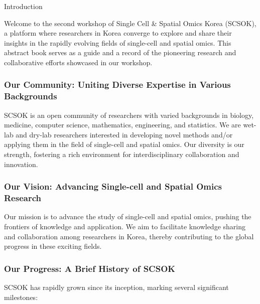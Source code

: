 \begin{coverpage}{Introduction}
{
Welcome to the second workshop of Single Cell \& Spatial Omics Korea (SCSOK), a platform where researchers in Korea converge to explore and share their insights in the rapidly evolving fields of single-cell and spatial omics. This abstract book serves as a guide and a record of the pioneering research and collaborative efforts showcased in our workshop.
\\
\subsubsection*{Our Community: Uniting Diverse Expertise in Various Backgrounds}
SCSOK is an open community of researchers with varied backgrounds in biology, medicine, computer science, mathematics, engineering, and statistics. We are wet-lab and dry-lab researchers interested in developing novel methods and/or applying them in the field of single-cell and spatial omics. Our diversity is our strength, fostering a rich environment for interdisciplinary collaboration and innovation.

\subsubsection*{Our Vision: Advancing Single-cell and Spatial Omics Research}
Our mission is to advance the study of single-cell and spatial omics, pushing the frontiers of knowledge and application. We aim to facilitate knowledge sharing and collaboration among researchers in Korea, thereby contributing to the global progress in these exciting fields.
\\
\subsubsection*{Our Progress: A Brief History of SCSOK}
SCSOK has rapidly grown since its inception, marking several significant milestones:

}
\end{coverpage}
